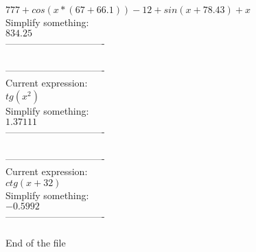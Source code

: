 \documentclass[12pt]{article}
\begin{document}
\( 777+cos(x*(67+66.1))-12+sin(x+78.43)+x\) \\
Simplify something:\\
\( 834.25\) \\
-------------------------------\\
\\
-------------------------------\\
Current expression:\\
\( tg({{x}^{2}})\) \\
Simplify something:\\
\( 1.37111\) \\
-------------------------------\\
\\
-------------------------------\\
Current expression:\\
\( ctg(x+32)\) \\
Simplify something:\\
\( -0.5992\) \\
-------------------------------\\
\\

        End of the file
        
\end{document}
